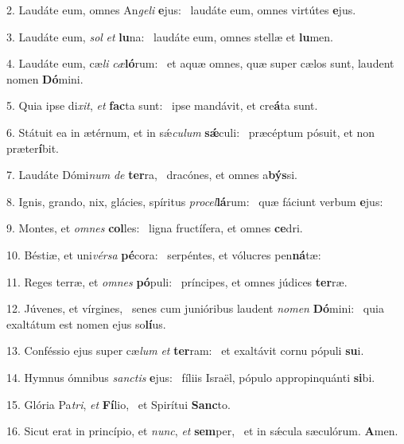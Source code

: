 2. Laudáte eum, omnes An\textit{ge}\textit{li} \textbf{e}jus: \ast\  laudáte eum, omnes virtútes \textbf{e}jus.\

3. Laudáte eum, \textit{sol} \textit{et} \textbf{lu}na: \ast\  laudáte eum, omnes stellæ et \textbf{lu}men.\

4. Laudáte eum, cæ\textit{li} \textit{cæ}\textbf{ló}rum: \ast\  et aquæ omnes, quæ super cælos sunt, laudent nomen \textbf{Dó}mini.\

5. Quia ipse di\textit{xit}, \textit{et} \textbf{fac}ta sunt: \ast\  ipse mandávit, et cre\textbf{á}ta sunt.\

6. Státuit ea in ætérnum, et in sǽ\textit{cu}\textit{lum} \textbf{sǽ}culi: \ast\  præcéptum pósuit, et non præter\textbf{í}bit.\

7. Laudáte Dómi\textit{num} \textit{de} \textbf{ter}ra, \ast\  dracónes, et omnes a\textbf{býs}si.\

8. Ignis, grando, nix, glácies, spíritus \textit{pro}\textit{cel}\textbf{lá}rum: \ast\  quæ fáciunt verbum \textbf{e}jus:\

9. Montes, et \textit{om}\textit{nes} \textbf{col}les: \ast\  ligna fructífera, et omnes \textbf{ce}dri.\

10. Béstiæ, et uni\textit{vér}\textit{sa} \textbf{pé}cora: \ast\  serpéntes, et vólucres pen\textbf{ná}tæ:\

11. Reges terræ, et \textit{om}\textit{nes} \textbf{pó}puli: \ast\  príncipes, et omnes júdices \textbf{ter}ræ.\

12. Júvenes, et vírgines, \dag\  senes cum junióribus laudent \textit{no}\textit{men} \textbf{Dó}mini: \ast\  quia exaltátum est nomen ejus so\textbf{lí}us.\

13. Conféssio ejus super cæ\textit{lum} \textit{et} \textbf{ter}ram: \ast\  et exaltávit cornu pópuli \textbf{su}i.\

14. Hymnus ómnibus \textit{sanc}\textit{tis} \textbf{e}jus: \ast\  fíliis Israël, pópulo appropinquánti \textbf{si}bi.\

15. Glória Pa\textit{tri}, \textit{et} \textbf{Fí}lio, \ast\  et Spirítui \textbf{Sanc}to.\

16. Sicut erat in princípio, et \textit{nunc}, \textit{et} \textbf{sem}per, \ast\  et in sǽcula sæculórum. \textbf{A}men.\

